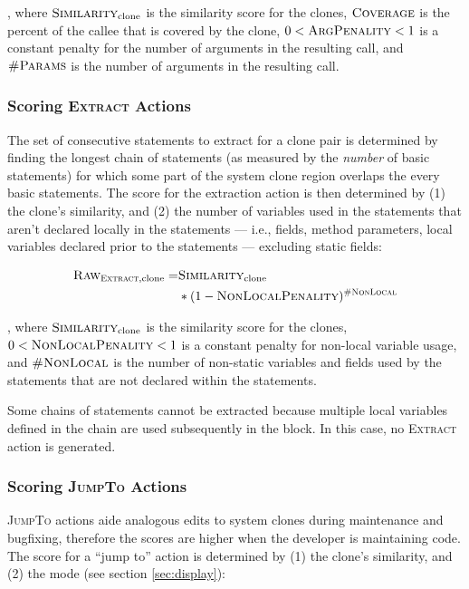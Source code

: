 \documentclass[nocopyrightspace,10pt]{sigplanconf}
\begin{document}
\noindent, where $\textsc{Similarity}_{\text{clone}}$ is the similarity score for the clones, 
$\textsc{Coverage}$ is
the percent of the callee that is covered by the clone, $0 < \textsc{ArgPenality} < 1$ is a constant
penalty for the number of arguments in the resulting call, and $\textsc{\#Params}$ is
the number of arguments in the resulting call. 

\subsubsection{Scoring \textsc{Extract} Actions}
\label{sec:extract}
The set of consecutive statements to extract for a clone pair is
determined by finding the longest chain of statements (as measured by
the \textit{number} of basic statements) for which some part of the
system clone region overlaps the every basic statements.
The score for the extraction
action is then determined by (1) the clone's similarity, and (2) the
number of variables used in the statements that aren't declared
locally in the statements --- i.e., fields, method parameters, local
variables declared prior to the statements --- excluding static
fields:

\begin{align*}
  \textsc{Raw}_{\textsc{Extract}, \text{clone}} = & \textsc{Similarity}_{\text{clone}} \\ 
   & * (1 - \textsc{NonLocalPenality})^{\textsc{\#NonLocal}}
\end{align*}

\noindent, where $\textsc{Similarity}_{\text{clone}}$ is the
similarity score for the clones, $0 < \textsc{NonLocalPenality} < 1$
is a constant penalty for non-local variable usage, and
$\textsc{\#NonLocal}$ is the number of non-static variables and fields
used by the statements that are not declared within the statements.

Some chains of statements cannot be extracted because multiple local
variables defined in the chain are used subsequently in the block. In
this case, no \textsc{Extract} action is generated.

\subsubsection{Scoring \textsc{JumpTo} Actions}
\textsc{JumpTo} actions aide analogous edits to system clones
during maintenance and bugfixing, therefore the scores are higher when
the developer is maintaining code. The score for a ``jump to'' action
is determined by (1) the clone's similarity, and (2) the mode (see
section \ref{sec:display}):
\end{document}
